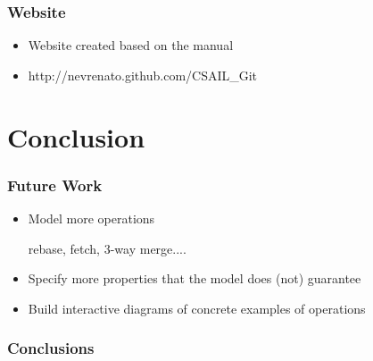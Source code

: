 \documentclass{beamer}
\begin{document}
\begin{frame}
	\frametitle{Website}
	\begin{itemize}
	\item Website created based on the manual 
	\item http://nevrenato.github.com/CSAIL\_Git
	\end{itemize}

\end{frame}

\section{Conclusion}

\begin{frame}
	\frametitle{Future Work}
	\begin{itemize}
	\item Model more operations 
		\begin{itemize}
			rebase, fetch, 3-way merge....
		\end{itemize}
	\item Specify more properties that the model does (not) guarantee
	\item Build interactive diagrams of concrete examples of operations 
	\end{itemize}
\end{frame}

\begin{frame}
	\frametitle{Conclusions}
\end{frame}
\end{document}
